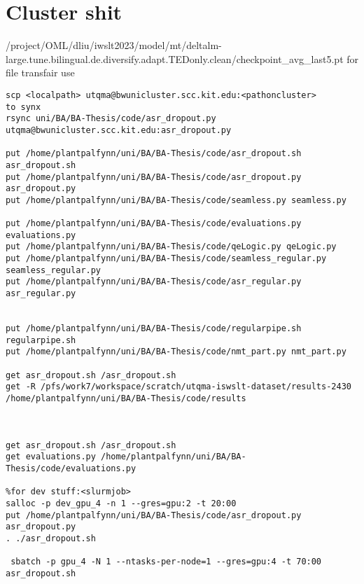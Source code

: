 \section{Cluster shit}
/project/OML/dliu/iwslt2023/model/mt/deltalm-large.tune.bilingual.de.diversify.adapt.TEDonly.clean/checkpoint_avg_last5.pt
for file transfair use
\begin{verbatim}
scp <localpath> utqma@bwunicluster.scc.kit.edu:<pathoncluster>
to synx
rsync uni/BA/BA-Thesis/code/asr_dropout.py utqma@bwunicluster.scc.kit.edu:asr_dropout.py

put /home/plantpalfynn/uni/BA/BA-Thesis/code/asr_dropout.sh asr_dropout.sh
put /home/plantpalfynn/uni/BA/BA-Thesis/code/asr_dropout.py asr_dropout.py
put /home/plantpalfynn/uni/BA/BA-Thesis/code/seamless.py seamless.py

put /home/plantpalfynn/uni/BA/BA-Thesis/code/evaluations.py evaluations.py
put /home/plantpalfynn/uni/BA/BA-Thesis/code/qeLogic.py qeLogic.py
put /home/plantpalfynn/uni/BA/BA-Thesis/code/seamless_regular.py seamless_regular.py
put /home/plantpalfynn/uni/BA/BA-Thesis/code/asr_regular.py asr_regular.py


put /home/plantpalfynn/uni/BA/BA-Thesis/code/regularpipe.sh regularpipe.sh
put /home/plantpalfynn/uni/BA/BA-Thesis/code/nmt_part.py nmt_part.py

get asr_dropout.sh /asr_dropout.sh
get -R /pfs/work7/workspace/scratch/utqma-iswslt-dataset/results-2430  /home/plantpalfynn/uni/BA/BA-Thesis/code/results



get asr_dropout.sh /asr_dropout.sh
get evaluations.py /home/plantpalfynn/uni/BA/BA-Thesis/code/evaluations.py
 
%for dev stuff:<slurmjob>
salloc -p dev_gpu_4 -n 1 --gres=gpu:2 -t 20:00
put /home/plantpalfynn/uni/BA/BA-Thesis/code/asr_dropout.py asr_dropout.py
. ./asr_dropout.sh

 sbatch -p gpu_4 -N 1 --ntasks-per-node=1 --gres=gpu:4 -t 70:00 asr_dropout.sh

\end{verbatim}

